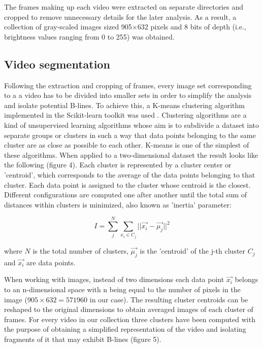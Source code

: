 \documentclass[12pt]{article} %
\begin{document}
	The frames making up each video were extracted on separate directories and cropped to remove unnecessary details for the later analysis. As a result, a collection of gray-scaled images sized 905$\times$632 pixels and 8 bits of depth (i.e., brightness values ranging from 0 to 255) was obtained.
	
\subsection{Video segmentation}

	Following the extraction and cropping of frames, every image set corresponding to a a video has to be divided into smaller sets in order to simplify the analysis and isolate potential B-lines. To achieve this, a K-means clustering algorithm implemented in the Scikit-learn toolkit was used \cite{sklearn}. Clustering algorithms are a kind of unsupervised learning algorithms whose aim is to subdivide a dataset into separate groups or clusters in such a way that data points belonging to the same cluster are as close as possible to each other. K-means is one of the simplest of these algorithms. When applied to a two-dimensional dataset the result looks like the following (figure 4)\cite{python}. Each cluster is represented by a cluster center or 'centroid', which corresponds to the average of the data points belonging to that cluster. Each data point is assigned to the cluster whose centroid is the closest. Different configurations are computed one after another until the total sum of distances within clusters is minimized, also known as 'inertia' parameter:
	
	\[ I = \sum_j^N \sum_{x_i \in C_j} || \vec{x_i} - \vec{ \mu_j} ||^2 \]
	
	where $N$ is the total number of clusters, $\vec{\mu_j}$ is the 'centroid' of the j-th cluster $C_j$ and $\vec{x_i}$ are data points.
	
	When working with images, instead of two dimensions each data point $\vec{x_i}$ belongs to an n-dimensional space with n being equal to the number of pixels in the image ($905 \times 632=571960$ in our case). The resulting cluster centroids can be reshaped to the original dimensions to obtain averaged images of each cluster of frames. For every video in our collection three clusters have been computed with the purpose of obtaining a simplified representation of the video and isolating fragments of it that may exhibit B-lines (figure 5). 
	
\end{document}
